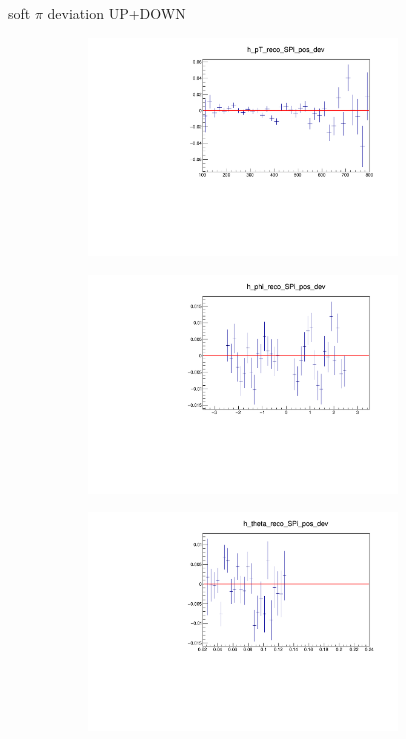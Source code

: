 \documentclass[11pt]{beamer}
\begin{document}
\begin{frame}{soft $\pi$ deviation UP+DOWN}
\begin{figure}
\begin{subfigure}{0.45\textwidth}
\includegraphics[width=0.9\textwidth]{third/up_plus_down_pdf/pT_2.pdf}
\end{subfigure}
\begin{subfigure}{0.45\textwidth}
\includegraphics[width=0.9\textwidth]{third/up_plus_down_pdf/phi_2.pdf}
\end{subfigure}
\begin{subfigure}{0.45\textwidth}
\includegraphics[width=0.9\textwidth]{third/up_plus_down_pdf/theta_2.pdf}

\end{subfigure}
\end{figure}
\end{frame}
\end{document}
